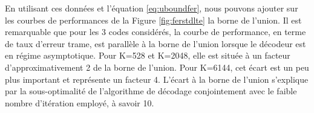 \begin{table}[]
\centering
\caption{Spectre de distance pour trois turbo codes du standard LTE.}
\label{tab:spectre}
\end{table}
En utilisant ces données et l'équation \ref{eq:uboundfer}, nous pouvons ajouter sur les courbes de performances de la Figure 
\ref{fig:ferstdlte} la borne de l'union. Il est remarquable que pour les 3 codes considérés, la courbe de 
performance, en terme de taux d'erreur trame, est parallèle à la borne de l'union lorsque le décodeur est en régime asymptotique. Pour K=528 et K=2048, 
elle est située à un facteur d'approximativement 2 de la borne de l'union. Pour K=6144, cet écart 
est un peu plus important et représente un facteur 4. L'écart à la borne de l'union s'explique par la sous-optimalité de 
l'algorithme de décodage conjointement avec le faible nombre d'itération employé, à savoir 10.



